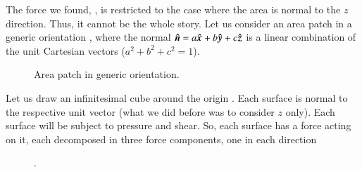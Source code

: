 The force we found, , is restricted to the case
where the area is normal to the $z$ direction. Thus, it cannot be the
whole story. Let us consider an area patch in a generic orientation
, where the normal ${\boldsymbol{\hat{n}}}=a {\boldsymbol{\hat{x}}} + b {\boldsymbol{\hat{y}}} + c {\boldsymbol{\hat{z}}}$ is a linear combination of the unit Cartesian vectors ($a^2+b^2+c^2=1$). 

\begin{figure}
  \begin{center}
  \end{center}
  \caption[]{Area patch in generic orientation.}
  \label{fig:tensor7}
\end{figure}


Let us draw an infinitesimal cube around the origin
. Each surface is normal to the respective unit
vector (what we did before was to consider $z$ only). Each surface will be subject to pressure and shear. So, each surface has a force acting on it, each decomposed in three force components, one in each direction 


\begin{figure}
  \begin{center}
  \end{center}
  \caption[]{.}
  \label{fig:tensor8}
\end{figure}


